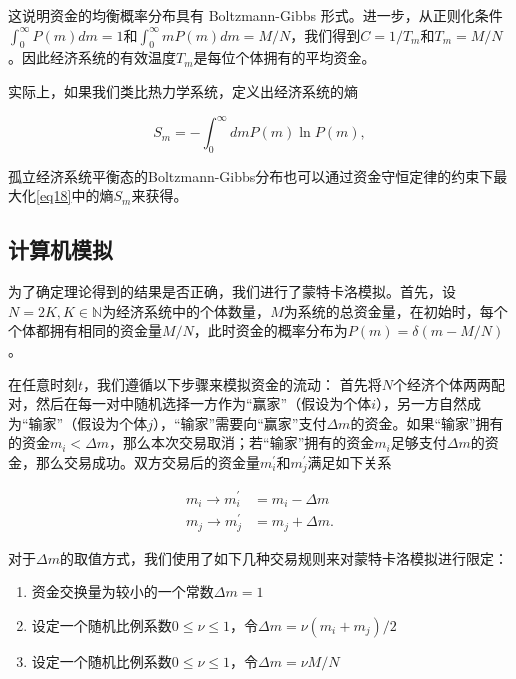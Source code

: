 \documentclass[tsinghuacite]{HustGraduPaper}
\begin{document}
			\vspace{1.5em}
	
			这说明资金的均衡概率分布具有 Boltzmann-Gibbs 形式。进一步，从正则化条件$\int_{0}^{\infty} P(m) dm = 1$和$\int_{0}^{\infty} m P(m) dm = M/N$，我们得到$C = 1/ T_m$和$T_m = M/N$。因此经济系统的有效温度$T_m$是每位个体拥有的平均资金。
			
			实际上，如果我们类比热力学系统，定义出经济系统的熵
			
			\begin{equation}
				S_m = - \int_{0}^{\infty} dm P(m) \ln P(m),  \label{eq18}
			\end{equation}
			
			\vspace{1.5em}
			
			孤立经济系统平衡态的Boltzmann-Gibbs分布也可以通过资金守恒定律的约束下最大化\eqref{eq18}中的熵$S_m$来获得\cite{wannier1987statistical}。	
	
	
		\subsection{计算机模拟}\label{subsec:simulation}
	
		为了确定理论得到的结果是否正确，我们进行了蒙特卡洛模拟。首先，设$N = 2K, K \in \mathbb{N}$为经济系统中的个体数量，$M$为系统的总资金量，在初始时，每个个体都拥有相同的资金量$M/N$，此时资金的概率分布为$P(m) = \delta(m - M/N)$。
		
		在任意时刻$t$，我们遵循以下步骤来模拟资金的流动： 首先将$N$个经济个体两两配对，然后在每一对中随机选择一方作为“赢家”（假设为个体$i$），另一方自然成为“输家”（假设为个体$j$），“输家”需要向“赢家”支付$\Delta m$的资金。如果“输家”拥有的资金$m_{i} < \Delta m$，那么本次交易取消；若“输家”拥有的资金$m_i$足够支付$\Delta m$的资金，那么交易成功。双方交易后的资金量$m_i^{'}$和$m_j^{'}$满足如下关系
					

		\begin{align}
			m_i \rightarrow m_{i}^{'} &= m_i - \Delta m  \\
			m_j \rightarrow m_{j}^{'} &= m_j + \Delta m.   \label{eq19}
		\end{align}
		
		\vspace{1.5em}
		
		对于$\Delta m$的取值方式，我们使用了如下几种交易规则来对蒙特卡洛模拟进行限定：
		
		\begin{enumerate}[label=(\roman*)]
		
			\item 资金交换量为较小的一个常数$\Delta m = 1$
			
			\item 设定一个随机比例系数$0 \leq \nu \leq 1$，令$\Delta m = \nu (m_i + m_j)/2$
			
			\item 设定一个随机比例系数$0 \leq \nu \leq 1$，令$\Delta m = \nu M/N$
		
		\end{enumerate}
		
\end{document}
